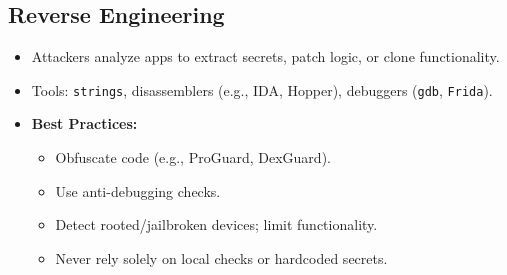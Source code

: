 \subsection{Reverse Engineering}{
\begin{itemize}[noitemsep]
  \item Attackers analyze apps to extract secrets, patch logic, or clone functionality.
  \item Tools: \texttt{strings}, disassemblers (e.g., IDA, Hopper), debuggers (\texttt{gdb}, \texttt{Frida}).
  \item \textbf{Best Practices:}
    \begin{itemize}[noitemsep]
      \item Obfuscate code (e.g., ProGuard, DexGuard).
      \item Use anti-debugging checks.
      \item Detect rooted/jailbroken devices; limit functionality.
      \item Never rely solely on local checks or hardcoded secrets.
    \end{itemize}
\end{itemize}}
